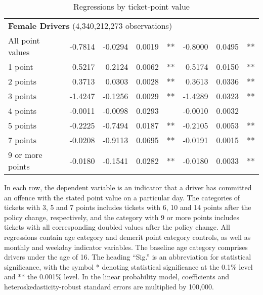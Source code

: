 \begin{table}
\begin{tabular}{l r r r l r r l}
\hline 

\multicolumn{7}{l}{\textbf{Female Drivers} (4,340,212,273 observations)} \\ 

All point values                &  -0.7814       &  -0.0294        &  0.0019       &   **       &  -0.8000        &  0.0495       &   **       \\ 
1 point                         &  0.5217       &  0.2124        &  0.0062       &   **       &  0.5174        &  0.0150       &   **       \\ 
2 points                        &  0.3713       &  0.0303        &  0.0028       &   **       &  0.3613        &  0.0336       &   **       \\ 
3 points                        &  -1.4247       &  -0.1256        &  0.0029       &   **       &  -1.4289        &  0.0323       &   **       \\ 
4 points                        &  -0.0011       &  -0.0098        &  0.0293       &            &  -0.0010        &  0.0032       &            \\ 
5 points                        &  -0.2225       &  -0.7494        &  0.0187       &   **       &  -0.2105        &  0.0053       &   **       \\ 
7 points                        &  -0.0208       &  -0.9113        &  0.0695       &   **       &  -0.0191        &  0.0015       &   **       \\ 
9 or more points                &  -0.0180       &  -0.1541        &  0.0282       &   **       &  -0.0180        &  0.0033       &   **       \\ 

\hline 

\end{tabular} 
\caption{Regressions by ticket-point value} 
In each row, the dependent variable is an indicator that a driver has committed  
an offence with the stated point value on a particular day.  
The categories of tickets with 3, 5 and 7 points includes tickets  
with 6, 10 and 14 points after the policy change, respectively,  
and the category with 9 or more points includes tickets  
with all corresponding doubled values after the policy change. 
All regressions contain age category and demerit point category controls, 
as well as monthly and weekday indicator variables. 
The baseline age category comprises drivers under the age of 16. 
The heading ``Sig.'' is an abbreviation for statistical significance, with 
the symbol * denoting statistical significance at the 0.1\% level 
and ** the 0.001\% level. 
In the linear probability model, coefficients and heteroskedasticity-robust standard errors are  
multiplied by 100,000.  
\label{tab:seas_Logit_vs_LPMx100K_regs_by_points} 
\end{table} 
 

